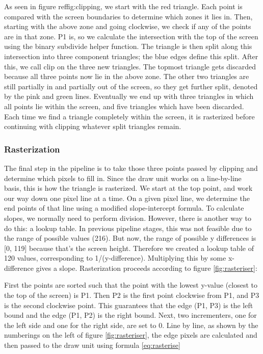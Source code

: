 \documentclass[onecolumn]{IEEEtran}
\begin{document}

As seen in figure ref{fig:clipping}, we start with the red triangle.  Each point is compared with the screen boundaries to determine which zones it lies in.  Then, starting with the above zone and going clockwise, we check if any of the points are in that zone.  P1 is, so we calculate the intersection with the top of the screen using the binary subdivide helper function.  The triangle is then split along this intersection into three component triangles; the blue edges define this split.  After this, we call clip on the three new triangles.  The topmost triangle gets discarded because all three points now lie in the above zone.  The other two triangles are still partially in and partially out of the screen, so they get further split, denoted by the pink and green lines.  Eventually we end up with three triangles in which all points lie within the screen, and five triangles which have been discarded.  Each time we find a triangle completely within the screen, it is rasterized before continuing with clipping whatever split triangles remain.

\subsubsection{Rasterization}
The final step in the pipeline is to take those three points passed by clipping and determine which pixels to fill in.  Since the draw unit works on a line-by-line basis, this is how the triangle is rasterized.  We start at the top point, and work our way down one pixel line at a time.  On a given pixel line, we determine the end points of that line using a modified slope-intercept formula.  To calculate slopes, we normally need to perform division.  However, there is another way to do this: a lookup table.  In previous pipeline stages, this was not feasible due to the range of possible values (216).  But now, the range of possible y differences is [0, 119] because that’s the screen height.  Therefore we created a lookup table of 120 values, corresponding to 1/(y-difference).  Multiplying this by some x-difference gives a slope.  Rasterization proceeds according to figure \ref{fig:rasteriser}:


First the points are sorted such that the point with the lowest y-value (closest to the top of the screen) is P1.  Then P2 is the first point clockwise from P1, and P3 is the second clockwise point.  This guarantees that the edge (P1, P3) is the left bound and the edge (P1, P2) is the right bound.  Next, two incrementers, one for the left side and one for the right side, are set to 0.  Line by line, as shown by the numberings on the left of figure \ref{fig:rasteriser}, the edge pixels are calculated and then passed to the draw unit using formula \ref{eq:rasterise}
\end{document}
